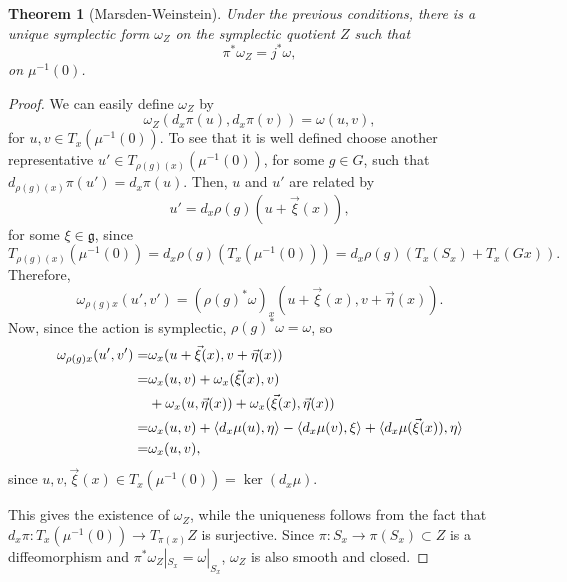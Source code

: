 \documentclass[12pt,a4paper]{book}
\newtheorem{thm}{Theorem}[section]
\theoremstyle{definition} \newtheorem{defn}[thm]{Definition}
\theoremstyle{definition} \newtheorem{ejemplo}[thm]{Example}
\theoremstyle{remark} \newtheorem{rem}[thm]{Remark}
\def\gg{\mathfrak{g}}
\DeclarePairedDelimiter\esc{\langle}{\rangle}
\begin{document}
    \begin{thm}[Marsden-Weinstein]
      Under the previous conditions, there is a unique symplectic form $\omega_Z$ on the symplectic quotient $Z$ such that
      \begin{equation*}
	\pi^*\omega_Z=j^*\omega,
      \end{equation*}
      on $\mu^{-1}(0)$.
    \end{thm}

    \begin{proof}
      We can easily define $\omega_Z$ by
      \begin{equation*}
	\omega_Z(d_x\pi(u),d_x\pi(v))=\omega(u,v),
      \end{equation*}
      for $u,v \in T_x(\mu^{-1}(0))$. To see that it is well defined choose another representative $u'\in T_{\rho(g)(x)}(\mu^{-1}(0))$, for some $g\in G$, such that $d_{\rho(g)(x)}\pi(u')=d_x\pi(u)$. Then, $u$ and $u'$ are related by
      \begin{equation*}
	u'=d_x\rho(g) (u+\vec{\xi}(x)),
      \end{equation*}
      for some $\xi \in \gg$, since $$T_{\rho(g)(x)}(\mu^{-1}(0))=d_x\rho(g)(T_x(\mu^{-1}(0)))=d_x\rho(g)(T_x(S_x)+T_x(Gx)).$$
      Therefore,
      \begin{equation*}
	\omega_{\rho(g)x}(u',v')=(\rho(g)^*\omega)_x(u+\vec{\xi}(x),v+\vec{\eta}(x)).
      \end{equation*}
      Now, since the action is symplectic, $\rho(g)^*\omega=\omega$, so
      \begin{align*}
	\omega_{\rho(g)x}(u',v')=&\omega_x(u+\vec{\xi}(x),v+\vec{\eta}(x)) \\
	=&\omega_x(u,v)+\omega_x(\vec{\xi}(x),v) \\ &+\omega_x(u,\vec{\eta}(x))+\omega_x(\vec{\xi}(x),\vec{\eta}(x)) \\
	=& \omega_x(u,v) + \esc{d_x\mu(u),\eta} - \esc{d_x\mu(v),\xi} + \esc{d_x\mu(\vec{\xi}(x)),\eta} \\
	=& \omega_x(u,v),
      \end{align*}
      since $u, v, \vec{\xi}(x) \in T_x(\mu^{-1}(0))=\ker(d_x\mu)$. 
      
      This gives the existence of $\omega_Z$, while the uniqueness follows from the fact that $d_x\pi:T_x(\mu^{-1}(0))\rightarrow T_{\pi(x)}Z$ is surjective. Since $\pi:S_x \rightarrow \pi(S_x)\subset Z$ is a diffeomorphism and $\pi^*\omega_Z|_{S_x}=\omega|_{S_x}$, $\omega_Z$ is also smooth and closed. 


\end{proof}
\end{document}
